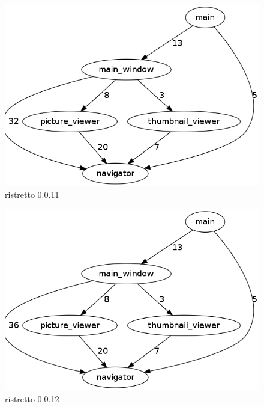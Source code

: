 \begin{figure}[h]
\center
\includegraphics[scale=0.4]{imagens/ristretto-0_0_11-doxyparse-2}
\caption{ristretto 0.0.11}
\label{fig:ristretto-0.0.11-doxyparse-2-anexo}
\end{figure}

\begin{figure}[h]
\center
\includegraphics[scale=0.4]{imagens/ristretto-0_0_12-doxyparse-2}
\caption{ristretto 0.0.12}
\label{fig:ristretto-0.0.12-doxyparse-2-anexo}
\end{figure}

